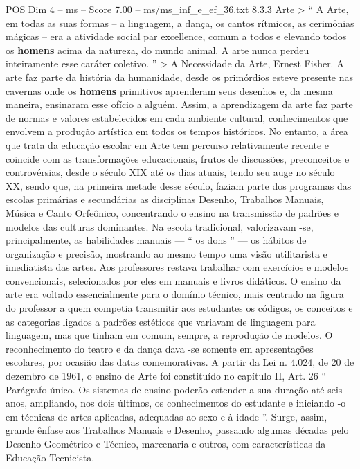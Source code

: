 \begin{textsample}{POS Dim 4 – ms – Score 7.00 – ms/ms\_inf\_e\_ef\_36.txt}  \label{ex:f4_pos_159}
8.3.3 Arte > “ A Arte, em todas as suas formas – a linguagem, a dança, os cantos rítmicos, as cerimônias mágicas – era a atividade social par excellence, comum a todos e elevando todos os \textbf{homens} acima da natureza, do mundo animal.
A arte nunca perdeu inteiramente esse caráter coletivo. ” > A Necessidade da Arte, Ernest Fisher.
A arte faz parte da história da humanidade, desde os primórdios esteve presente nas cavernas onde os \textbf{homens} primitivos aprenderam seus desenhos e, da mesma maneira, ensinaram esse ofício a alguém.
Assim, a aprendizagem da arte faz parte de normas e valores estabelecidos em cada ambiente cultural, conhecimentos que envolvem a produção artística em todos os tempos históricos.
No entanto, a área que trata da educação escolar em Arte tem percurso relativamente recente e coincide com as transformações educacionais, frutos de discussões, preconceitos e controvérsias, desde o século XIX até os dias atuais, tendo seu auge no século XX, sendo que, na primeira metade desse século, faziam parte dos programas das escolas primárias e secundárias as disciplinas Desenho, Trabalhos Manuais, Música e Canto Orfeônico, concentrando o ensino na transmissão de padrões e modelos das culturas dominantes.
Na escola tradicional, valorizavam -se, principalmente, as habilidades manuais — “ os dons ” — os hábitos de organização e precisão, mostrando ao mesmo tempo uma visão utilitarista e imediatista das artes.
Aos professores restava trabalhar com exercícios e modelos convencionais, selecionados por eles em manuais e livros didáticos.
O ensino da arte era voltado essencialmente para o domínio técnico, mais centrado na figura do professor a quem competia transmitir aos estudantes os códigos, os conceitos e as categorias ligados a padrões estéticos que variavam de linguagem para linguagem, mas que tinham em comum, sempre, a reprodução de modelos.
O reconhecimento do teatro e da dança dava -se somente em apresentações escolares, por ocasião das datas comemorativas.
A partir da Lei n. 4.024, de 20 de dezembro de 1961, o ensino de Arte foi constituído no capítulo II, Art. 26 “ Parágrafo único.
Os sistemas de ensino poderão estender a sua duração até seis anos, ampliando, nos dois últimos, os conhecimentos do estudante e iniciando -o em técnicas de artes aplicadas, adequadas ao sexo e à idade ”.
Surge, assim, grande ênfase aos Trabalhos Manuais e Desenho, passando algumas décadas pelo Desenho Geométrico e Técnico, marcenaria e outros, com características da Educação Tecnicista.

\end{textsample}
